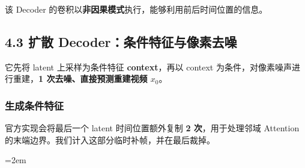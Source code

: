 \documentclass[
  11pt,
  a4paper,
  fontset=none]{ctexart}
\newcommand{\NotesTableStyle}{\linespread{1}\fontsize{9.5pt}{13pt}\selectfont\setlength{\tabcolsep}{4pt}\renewcommand{\arraystretch}{1.1}\setlength{\extrarowheight}{5pt}\setlength{\LTpre}{5pt}\setlength{\LTpost}{6pt}\setlength{\parskip}{0pt}\emergencystretch=2em}
\begin{document}
该 Decoder 的卷积以\textbf{非因果模式}执行，能够利用前后时间位置的信息。


\subsection{4.3 扩散
Decoder：条件特征与像素去噪}\label{ltx25-diffusion-decoder}

它先将 latent 上采样为条件特征 \textbf{context}，再以 context
为条件，对像素噪声进行重建，\textbf{1 次去噪、直接预测重建视频
\(x_0\)}。


\subsubsection{生成条件特征}\label{ltx25-context}

官方实现会将最后一个 latent 时间位置额外复制 \textbf{2 次}，用于处理邻域
Attention 的末端边界。我们计入这部分临时补帧，并在最后裁掉。

\begingroup\NotesTableStyle\fontsize{10.5pt}{14pt}\selectfont\renewcommand{\arraystretch}{1.08}\setlength{\extrarowheight}{3pt}
\end{document}
